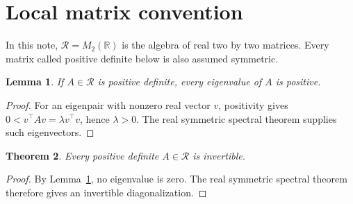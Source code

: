\documentclass{article}
\newcommand{\R}{\mathcal R}
\newtheorem{theorem}{Theorem}[section]
\newtheorem{lemma}[theorem]{Lemma}
\begin{document}
\setcounter{section}{2}
\section{Local matrix convention}
In this note, $\R=M_2(\mathbb R)$ is the algebra of real two by two matrices.
Every matrix called positive definite below is also assumed symmetric.
\begin{lemma}\label{lem:positive-spectrum}
If $A\in\R$ is positive definite, every eigenvalue of $A$ is positive.
\end{lemma}
\begin{proof}
For an eigenpair with nonzero real vector $v$, positivity gives
$0<v^\top Av=\lambda v^\top v$, hence $\lambda>0$.
The real symmetric spectral theorem supplies such eigenvectors.
\end{proof}
\begin{theorem}\label{thm:inverse}
Every positive definite $A\in\R$ is invertible.
\end{theorem}
\begin{proof}
By Lemma~\ref{lem:positive-spectrum}, no eigenvalue is zero.
The real symmetric spectral theorem therefore gives an invertible diagonalization.
\end{proof}
\end{document}
